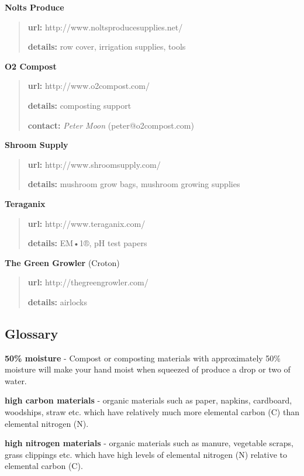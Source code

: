 \textbf{Nolts Produce}

\begin{quote}
\textbf{url:} http://www.noltsproducesupplies.net/

\textbf{details:} row cover, irrigation supplies, tools
\end{quote}

\textbf{O2 Compost}

\begin{quote}
\textbf{url:} http://www.o2compost.com/

\textbf{details:} composting support

\textbf{contact:} \emph{Peter Moon} (peter@o2compost.com)
\end{quote}

\textbf{Shroom Supply}

\begin{quote}
\textbf{url:} http://www.shroomsupply.com/

\textbf{details:} mushroom grow bags, mushroom growing supplies
\end{quote}

\textbf{Teraganix}

\begin{quote}
\textbf{url:} http://www.teraganix.com/

\textbf{details:} EM•1®, pH test papers
\end{quote}

\textbf{The Green Growler} (Croton)

\begin{quote}
\textbf{url:} http://thegreengrowler.com/

\textbf{details:} airlocks
\end{quote}

\subsection{Glossary}\label{glossary}

\textbf{50\% moisture} - Compost or composting materials with
approximately 50\% moisture will make your hand moist when squeezed of
produce a drop or two of water.

\textbf{high carbon materials} - organic materials such as paper,
napkins, cardboard, woodships, straw etc. which have relatively much
more elemental carbon (C) than elemental nitrogen (N).

\textbf{high nitrogen materials} - organic materials such as manure,
vegetable scraps, grass clippings etc. which have high levels of
elemental nitrogen (N) relative to elemental carbon (C).
